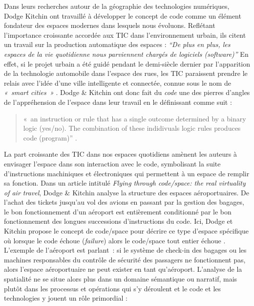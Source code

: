 Dans leurs recherches autour de la géographie des technologies numériques, Dodge  Kitchin ont travaillé à développer le concept de code comme un élément fondateur des espaces modernes dans lesquels nous évoluons. Reflétant l’importance croissante accordée aux TIC dans l’environnement urbain, ils citent un travail sur la production automatique des espaces : \textit{“De plus en plus, les espaces de la vie  quotidienne nous parviennent chargés de logiciels (software)”} \citep{Thrift2002} En effet, si le projet urbain a été guidé pendant le demi-siècle dernier par l’apparition de la technologie automobile dans l’espace des rues, les TIC paraissent prendre le relais avec l’idée d’une ville intelligente et connectée, connue sous le nom de \textit{« smart cities »} \citep{Ascher2009}. Dodge \& Kitchin ont donc fait du \textit{code} une des pierres d’angles de l’appréhension de l’espace dans leur travail en le définissant comme suit : 

\begin{quote}
« an instruction or rule that has a single outcome determined by a binary logic (yes/no). The combination of these indidivuals logic rules produces code (program)” \citep{Kitchin2011}.
\end{quote}

La part croissante des TIC dans nos espaces quotidiens amènent les auteurs à envisager l’espace dans son interaction avec le code, symbolisant la suite d’instructions machiniques et électroniques qui permettent à un espace de remplir sa fonction. Dans un article intitulé \textit{Flying through code/space: the real virtuality of air travel}, Dodge \& Kitchin analyse la structure des espaces aéroportuaires. De l’achat des tickets jusqu’au vol des avions en passant par la gestion des bagages, le bon fonctionnement d’un aéroport est entièrement conditionné par le bon fonctionnement des longues successions d’instructions du code. Ici, Dodge et Kitchin propose le concept de code/space pour décrire ce type d’espace spécifique où lorsque le code échoue (\textit{failure}) alors le code/space tout entier échoue \citep{Dodge2004}. L’exemple de l’aéroport est parlant : si le système de check-in des bagages ou les machines responsables du contrôle de sécurité des passagers ne fonctionnent pas, alors l’espace aéroportuaire ne peut exister en tant qu’aéroport. L’analyse de la spatialité ne se situe alors plus dans un domaine sémantique ou narratif, mais plutôt dans les processus et opérations qui s’y déroulent et le code et les technologies y jouent un rôle primordial : 

